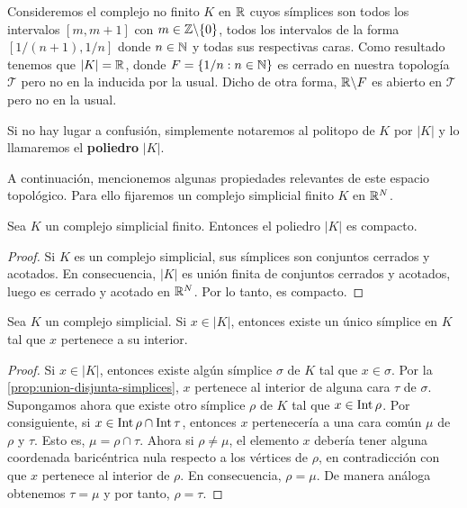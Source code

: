 \begin{ejemplo}
	Consideremos el complejo no finito $K$ en $\mathbb{R}$ cuyos símplices son todos los intervalos
	$[m,m+1]$ con $m \in \mathbb{Z} \backslash \{0\}$, todos los intervalos de la forma
	$[1/( n+1), 1/n]$ donde $n \in \mathbb{N}$ y todas sus respectivas caras. Como resultado
	tenemos que $|K| = \mathbb{R}$, donde $F = \{1/n : n \in \mathbb{N}\}$ es cerrado en nuestra
	topología $\mathcal{T}$ pero no en la inducida por la usual. Dicho de otra forma,
	$\mathbb{R} \backslash F$ es abierto en $\mathcal{T}$ pero no en la usual.
\end{ejemplo}

Si no hay lugar a confusión, simplemente notaremos al politopo de $K$ por $|K|$ y
lo llamaremos el \textbf{poliedro} $|K|$.

A continuación, mencionemos algunas propiedades relevantes de este espacio topológico.
Para ello fijaremos un complejo simplicial finito $K$ en $\mathbb{R}^{N}$.

\begin{proposicion}
	Sea $K$ un complejo simplicial finito. Entonces el poliedro $|K|$ es compacto.
\end{proposicion}
\begin{proof}
	Si $K$ es un complejo simplicial, sus símplices son conjuntos cerrados y
	acotados. En consecuencia, $|K|$ es unión finita de conjuntos cerrados y
	acotados, luego es cerrado y acotado en $\mathbb{R}^{N}$. Por lo tanto, es compacto.
\end{proof}

\begin{proposicion}
	Sea $K$ un complejo simplicial. \label{prop:simpl-soporte} Si $x \in |K|$, entonces
	existe un único símplice en $K$ tal que $x$ pertenece a su interior.
\end{proposicion}
\begin{proof}
	Si $x \in |K|$, entonces existe algún símplice $\sigma$ de $K$ tal que
	$x \in \sigma$. Por la \autoref{prop:union-disjunta-simplices}, $x$ pertenece
	al interior de alguna cara $\tau$ de $\sigma$. Supongamos ahora que existe otro
	símplice $\rho$ de $K$ tal que $x \in \operatorname{Int} \rho$. Por consiguiente, si $x
	\in \operatorname{Int} \rho \cap \operatorname{Int} \tau$, entonces $x$ pertenecería a una cara
	común $\mu$ de $\rho$ y $\tau$. Esto es, $\mu = \rho \cap \tau$. Ahora si $\rho
	\neq \mu$, el elemento $x$ debería tener alguna coordenada baricéntrica nula
	respecto a los vértices de $\rho$, en contradicción con que $x$ pertenece al interior
	de $\rho$. En consecuencia, $\rho = \mu$. De manera análoga obtenemos
	$\tau = \mu$ y por tanto, $\rho = \tau$.
\end{proof}

